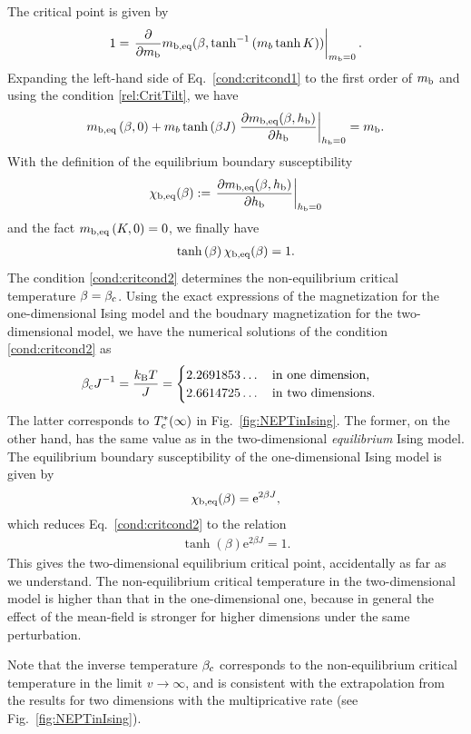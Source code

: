 The critical point is given by
\begin{align}
1=\left.\frac{\partial}{\partial m_{\rm b}}m_{\rm b,eq}(\beta, \tanh^{-1}\left(m_{b}\tanh K\right))\right|_{m_{\rm b}=0}.\label{rel:CritTilt}
\end{align}
Expanding the left-hand side of Eq.~\eqref{cond:critcond1} to the first order of $m_{\rm b}$ and using the condition \eqref{rel:CritTilt}, we have
\begin{align}
m_{\rm b,eq}\left(\beta,0\right) + m_{b}\tanh\left(\beta J\right)\left.\frac{\partial m_{\rm b,eq}(\beta,h_{\rm b})}{\partial h_{\rm b}}\right|_{h_{\rm b}=0} = m_{\rm b}.
\end{align}
With the definition of the equilibrium boundary susceptibility
\begin{align}
\chi_{\rm b, eq}(\beta):=\left.\frac{\partial m_{\rm b,eq}(\beta,h_{\rm b})}{\partial h_{\rm b}}\right|_{h_{\rm b}=0}
\end{align}
and the fact $m_{\rm b,eq}\left(K,0\right)=0$, we finally have
\begin{align}
\tanh \left(\beta\right)\chi_{\rm b, eq}(\beta) = 1.\label{cond:critcond2}
\end{align}
The condition \eqref{cond:critcond2} determines the non-equilibrium critical temperature $\beta=\beta_{\rm c}$. Using the exact expressions of the magnetization for the one-dimensional Ising model and the boudnary magnetization for the two-dimensional model, we have the numerical solutions of the condition \eqref{cond:critcond2} as
\begin{align}
{\beta_{\rm c}J}^{-1}=\frac{k_{\rm B}T}{J}=\begin{cases}
2.2691853\dots\quad\text{in one dimension,}\\
2.6614725\dots\quad\text{in two dimensions.}
\end{cases}
\end{align}
The latter corresponds to $T^{*}_{\rm c}(\infty)$ in Fig.~\ref{fig:NEPTinIsing}. The former, on the other hand, has the same value as in the two-dimensional \textit{equilibrium} Ising model. The equilibrium boundary susceptibility of the one-dimensional Ising model is given by
\begin{align}
\chi_{\rm b, eq}(\beta) = \mathrm{e}^{2\beta J},
\end{align}
which reduces Eq.~\eqref{cond:critcond2} to the relation
\begin{align}
\tanh \left(\beta\right)\mathrm{e}^{2\beta J} = 1.
\end{align}
This gives the two-dimensional equilibrium critical point, accidentally as far as we understand. The non-equilibrium critical temperature in the two-dimensional model is higher than that in the one-dimensional one, because in general the effect of the mean-field is stronger for higher dimensions under the same perturbation.

Note that the inverse temperature $\beta_{\rm c}$ corresponds to the non-equilibrium critical temperature in the limit $v\to\infty$, and is consistent with the extrapolation from the results for two dimensions with the multipricative rate (see Fig.~\ref{fig:NEPTinIsing}).


